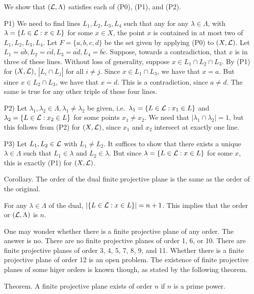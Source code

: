 \proof We show that $({\cal L}, \Lambda)$ satisfies each of (P0), (P1), and (P2).
\medskip
\item {P1)} We need to find lines $L_1, L_2, L_3, L_4$ such that any for any $\lambda\in \Lambda$, with $\lambda = \{L\in {\cal L} : x\in L\}$ for some $x\in X$, the point $x$ is contained in at most two of $L_1, L_2, L_3, L_4$. Let $F = \{a,b,c,d\}$ be the set given by applying (P0) to $(X,{\cal L})$. Let $L_1 = \overline{ab}, L_2 = \overline{cd}, L_3 = \overline{ad}, L_4 = \overline{bc}$. Suppose, towards a contradiction, that $x$ is in three of these lines. Without loss of generality, suppose $x\in L_1\cap L_2\cap L_3$. By (P1) for $(X,{\cal L})$, $|L_i\cap L_j|$ for all $i\neq j$. Since $x\in L_1\cap L_3$, we have that $x = a$. But since $x\in L_2\cap L_3$, we have that $x = d$. This is a contradiction, since $a\neq d$. The same is true for any other triple of these four lines.
\smallskip
\item {P2)} Let $\lambda_1,\lambda_2\in \Lambda, \lambda_1\neq\lambda_2$ be given, i.e.\  $\lambda_1 = \{ L\in {\cal L} : x_1\in L\}$ and $\lambda_2 = \{L\in {\cal L} : x_2\in L\}$ for some points $x_1\neq x_2$. We need that $|\lambda_1\cap\lambda_2| = 1$, but this follows from (P2) for $(X,{\cal L})$, since $x_1$ and $x_2$ intersect at exactly one line.
\smallskip
\item {P3)} Let $L_1, L_2\in {\cal L}$ with $L_1\neq L_2$. It suffices to show that there exists a unique $\lambda \in \Lambda$ such that $L_1\in \lambda$ and $L_2\in \lambda$. But since $\lambda = \{L\in {\cal L} : x\in L\}$ for some $x$, this is exactly (P1) for $(X,{\cal L})$.\slug           
                
\proclaim Corollary. The order of the dual finite projective plane is the same as the order of the original.

\proof For any $\lambda \in \Lambda$ of the dual, $|\{L\in {\cal L} : x\in L\}| = n+1$. This implies that the order or $({\cal L}, \Lambda)$ is $n$.\slug

One may wonder whether there is a finite projective plane of any order. The answer is no. There are no finite projective planes of order 1, 6, or 10. There are finite projective planes of order 3, 4, 5, 7, 8, 9, and 11. Whether there is a finite projective plane of order 12 is an open problem. The existence of finite projective planes of some higer orders is known though, as stated by the following theorem.

\proclaim Theorem. A finite projective plane exists of order $n$ if $n$ is a prime power.

